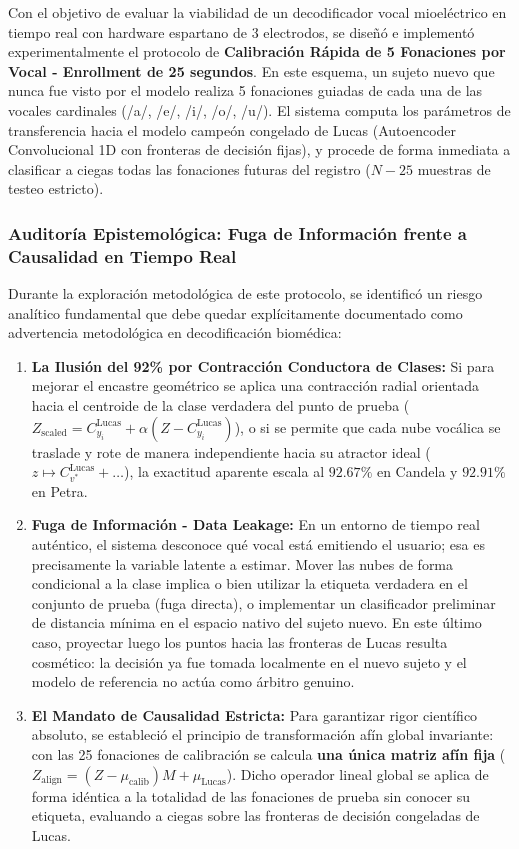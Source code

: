 \documentclass[11pt,a4paper]{article}
\begin{document}
Con el objetivo de evaluar la viabilidad de un decodificador vocal mioeléctrico en tiempo real con hardware espartano de 3 electrodos, se diseñó e implementó experimentalmente el protocolo de \textbf{Calibración Rápida de 5 Fonaciones por Vocal - Enrollment de 25 segundos}. En este esquema, un sujeto nuevo que nunca fue visto por el modelo realiza 5 fonaciones guiadas de cada una de las vocales cardinales (/a/, /e/, /i/, /o/, /u/). El sistema computa los parámetros de transferencia hacia el modelo campeón congelado de Lucas (Autoencoder Convolucional 1D con fronteras de decisión fijas), y procede de forma inmediata a clasificar a ciegas todas las fonaciones futuras del registro ($N - 25$ muestras de testeo estricto).

\subsubsection{Auditoría Epistemológica: Fuga de Información frente a Causalidad en Tiempo Real}
\label{subsubsec:auditoria_epistemologica_trampa}

Durante la exploración metodológica de este protocolo, se identificó un riesgo analítico fundamental que debe quedar explícitamente documentado como advertencia metodológica en decodificación biomédica:
\begin{enumerate}
    \item \textbf{La Ilusión del 92\% por Contracción Conductora de Clases:} Si para mejorar el encastre geométrico se aplica una contracción radial orientada hacia el centroide de la clase verdadera del punto de prueba ($Z_{\text{scaled}} = C_{y_i}^{\text{Lucas}} + \alpha (Z - C_{y_i}^{\text{Lucas}})$), o si se permite que cada nube vocálica se traslade y rote de manera independiente hacia su atractor ideal ($z \mapsto C_{v^*}^{\text{Lucas}} + \dots$), la exactitud aparente escala al $92.67\%$ en Candela y $92.91\%$ en Petra.
    \item \textbf{Fuga de Información - Data Leakage:} En un entorno de tiempo real auténtico, el sistema desconoce qué vocal está emitiendo el usuario; esa es precisamente la variable latente a estimar. Mover las nubes de forma condicional a la clase implica o bien utilizar la etiqueta verdadera en el conjunto de prueba (fuga directa), o implementar un clasificador preliminar de distancia mínima en el espacio nativo del sujeto nuevo. En este último caso, proyectar luego los puntos hacia las fronteras de Lucas resulta cosmético: la decisión ya fue tomada localmente en el nuevo sujeto y el modelo de referencia no actúa como árbitro genuino.
    \item \textbf{El Mandato de Causalidad Estricta:} Para garantizar rigor científico absoluto, se estableció el principio de transformación afín global invariante: con las 25 fonaciones de calibración se calcula \textbf{una única matriz afín fija} ($Z_{\text{align}} = (Z - \mu_{\text{calib}}) M + \mu_{\text{Lucas}}$). Dicho operador lineal global se aplica de forma idéntica a la totalidad de las fonaciones de prueba sin conocer su etiqueta, evaluando a ciegas sobre las fronteras de decisión congeladas de Lucas.
\end{enumerate}
\end{document}
